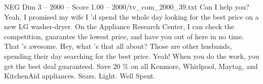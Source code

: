 \begin{textsample}{NEG Dim 3 – 2000 – Score 1.00 – 2000/tv\_com\_2000\_39.txt}  \label{ex:f3_neg_012}
Can I help you?
Yeah, I promised my wife I 'd spend the whole day looking for the best price on a new LG washer-dryer.
On the Appliance Research Center, I can check the competition, guarantee the lowest price, and have you out of here in no time.
That 's awesome.
Hey, what 's that all about?
Those are other husbands, spending their day searching for the best price.
Yeah!
When you do the work, you get the best deal guaranteed.
Save 20 \% on all Kenmore, Whirlpool, Maytag, and KitchenAid appliances.
Sears.
Light.
Well Spent.

\end{textsample}
